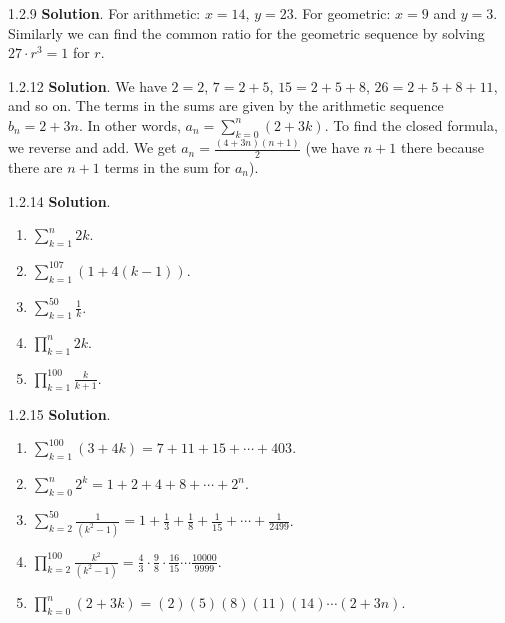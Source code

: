 \documentclass[11pt,]{book}
\theoremstyle{ptxplainnotitle}
\theoremstyle{ptxplaintitle}
\theoremstyle{ptxdefinitionnotitle}
\theoremstyle{ptxdefinitiontitle}
\theoremstyle{ptxdefinitionnotitle}
\theoremstyle{ptxdefinitiontitle}
\theoremstyle{ptxdefinitionnotitle}
\theoremstyle{ptxdefinitiontitle}
\theoremstyle{ptxdefinitiontitlenonumber}
\theoremstyle{ptxdefinitiontitlenonumber}
\numberwithin{equation}{chapter}
\renewcommand{\d}{\displaystyle}
\begin{document}
\begin{divisionexercise}{1.2.9}
\textbf{Solution}.\quad%
\hypertarget{p-311}{}%
For arithmetic: \(x = 14\text{,}\) \(y = 23\text{.}\) For geometric: \(x = 9\) and \(y = 3\text{.}\)    Similarly we can find the common ratio for the geometric sequence by solving \(27\cdot r^3 = 1\) for \(r\text{.}\)%
\end{divisionexercise}%
\begin{divisionexercise}{1.2.12}
\textbf{Solution}.\quad%
\hypertarget{p-320}{}%
We have \(2 = 2\), \(7 = 2+5\), \(15 = 2 + 5 + 8\), \(26 = 2+5+8+11\), and so on. The terms in the sums are given by the arithmetic sequence \(b_n = 2+3n\). In other words, \(a_n = \sum_{k=0}^n (2+3k)\). To find the closed formula, we reverse and add. We get \(a_n = \frac{(4+3n)(n+1)}{2}\) (we have \(n+1\) there because there are \(n+1\) terms in the sum for \(a_n\)).%
\end{divisionexercise}%
\begin{divisionexercise}{1.2.14}
\textbf{Solution}.\quad%
\hypertarget{p-328}{}%
\leavevmode%
\begin{enumerate}[label=(\alph*)]
\item\hypertarget{li-177}{}\(\d\sum_{k=1}^n 2k\).%
\item\hypertarget{li-178}{}\(\d\sum_{k=1}^{107} (1 + 4(k-1))\).%
\item\hypertarget{li-179}{}\(\d\sum_{k=1}^{50} \frac{1}{k}\).%
\item\hypertarget{li-180}{}\(\d\prod_{k=1}^n 2k\).%
\item\hypertarget{li-181}{}\(\d\prod_{k=1}^{100} \frac{k}{k+1}\).%
\end{enumerate}
%
\end{divisionexercise}%
\begin{divisionexercise}{1.2.15}
\textbf{Solution}.\quad%
\hypertarget{p-330}{}%
\leavevmode%
\begin{enumerate}[label=(\alph*)]
\item\hypertarget{li-187}{}\(\d\sum_{k=1}^{100} (3+4k) = 7 + 11 + 15 + \cdots + 403\).%
\item\hypertarget{li-188}{}\(\d\sum_{k=0}^n 2^k = 1 + 2 + 4 + 8 + \cdots + 2^n\).%
\item\hypertarget{li-189}{}\(\d\sum_{k=2}^{50}\frac{1}{(k^2 - 1)} = 1 + \frac{1}{3} + \frac{1}{8} + \frac{1}{15} + \cdots + \frac{1}{2499}\).%
\item\hypertarget{li-190}{}\(\d\prod_{k=2}^{100}\frac{k^2}{(k^2-1)} = \frac{4}{3}\cdot\frac{9}{8}\cdot\frac{16}{15}\cdots\frac{10000}{9999}\).%
\item\hypertarget{li-191}{}\(\d\prod_{k=0}^n (2+3k) = (2)(5)(8)(11)(14)\cdots(2+3n)\).%
\end{enumerate}
%
\end{divisionexercise}%
\end{document}
